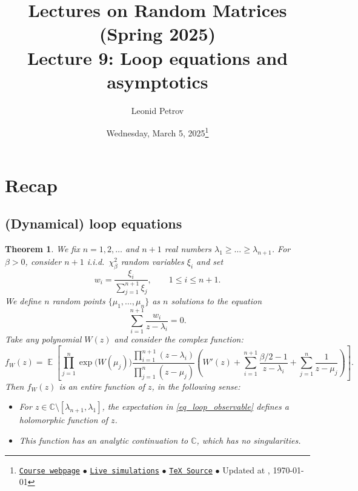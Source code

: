 \documentclass[letterpaper,11pt,oneside,reqno]{article}
\numberwithin{equation}{section}
\newtheorem{theorem}[proposition]{Theorem}
\theoremstyle{definition}
\begin{document}
\title{Lectures on Random Matrices
(Spring 2025)
\\Lecture 9: Loop equations and asymptotics}


\date{Wednesday, March 5, 2025\footnote{\href{https://lpetrov.cc/rmt25/}{\texttt{Course webpage}}
$\bullet$ \href{https://lpetrov.cc/simulations/model/random-matrices/}{\texttt{Live simulations}}
$\bullet$ \href{https://lpetrov.cc/rmt25/rmt25-notes/rmt2025-l09.tex}{\texttt{TeX Source}} 
$\bullet$
Updated at \currenttime, \today}}


\author{Leonid Petrov}

\maketitle

\section{Recap}

\subsection{(Dynamical) loop equations}

\begin{theorem}
	\label{Theorem_loop_equation}
 We fix $n=1,2,\dots$ and $n+1$ real numbers $\lambda_1\ge\dots\ge\lambda_{n+1}$. For $\beta>0$, consider $n+1$ i.i.d.\ $\chi^2_\beta$ random variables $\xi_i$ and set
 $$
  w_i=\frac{\xi_i}{\sum_{j=1}^{n+1} \xi_j}, \qquad 1\le i \le n+1.
 $$
 We define $n$ random points $\{\mu_1,\dots,\mu_n\}$ as $n$ solutions to the equation
 \begin{equation} \label{eq_mu_equation}
  \sum_{i=1}^{n+1} \frac{w_i}{z-\lambda_i}=0.
 \end{equation}
 Take any \emph{polynomial} $W(z)$ and consider the complex function:
 \begin{equation}
 \label{eq_loop_observable}
 f_W(z)=\operatorname{\mathbb{E}}\left[\prod_{j=1}^n \exp\bigl(W(\mu_j)\bigr) \frac{\prod_{i=1}^{n+1} (z-\lambda_i)}{\prod_{j=1}^n (z-\mu_j)} \left( W'(z)+\sum_{i=1}^{n+1} \frac{\beta/2-1}{z-\lambda_i} + \sum_{j=1}^n \frac{1}{z-\mu_j}\right)\right].
 \end{equation}
 Then $f_W(z)$ is an \emph{entire function} of $z$, in the following sense:
 \begin{itemize}
	 \item For $z\in \mathbb{C}\setminus [\lambda_{n+1},\lambda_1]$, the expectation in \eqref{eq_loop_observable} defines a holomorphic function of $z$.
  \item This function has an analytic continuation to $\mathbb{C}$, which has no singularities.
 \end{itemize}
\end{theorem}
\end{document}
